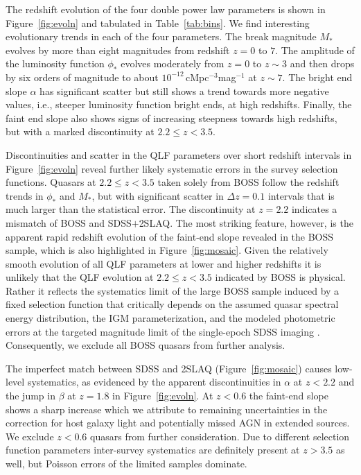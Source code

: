\documentclass[fleqn,usenatbib]{mnras}
\begin{document}
The redshift evolution of the four double power law parameters is
shown in Figure~\ref{fig:evoln} and tabulated in Table~\ref{tab:bins}.
We find interesting evolutionary trends in each of the four
parameters.  The break magnitude $M_*$ evolves by more than eight
magnitudes from redshift $z=0$ to $7$.  The amplitude of the
luminosity function $\phi_*$ evolves moderately from $z=0$ to $z\sim
3$ and then drops by six orders of magnitude to about
$10^{-12}$\,cMpc$^{-3}$mag$^{-1}$ at $z\sim 7$.  The bright end slope
$\alpha$ has significant scatter but still shows a trend towards more
negative values, i.e., steeper luminosity function bright ends, at
high redshifts. Finally, the faint end slope also shows signs of
increasing steepness towards high redshifts, but with a marked
discontinuity at $2.2\le z<3.5$.

Discontinuities and scatter in the QLF parameters over short redshift
intervals in Figure~\ref{fig:evoln} reveal further likely systematic
errors in the survey selection functions.  Quasars at $2.2\le z<3.5$
taken solely from BOSS \citep{2013ApJ...773...14R} follow the redshift
trends in $\phi_*$ and $M_*$, but with significant scatter in $\Delta
z=0.1$ intervals that is much larger than the statistical error.  The
discontinuity at $z=2.2$ indicates a mismatch of BOSS and
SDSS$+$2SLAQ. The most striking feature, however, is the apparent
rapid redshift evolution of the faint-end slope revealed in the BOSS
sample, which is also highlighted in Figure~\ref{fig:mosaic}. Given
the relatively smooth evolution of all QLF parameters at lower and
higher redshifts it is unlikely that the QLF evolution at $2.2\le
z<3.5$ indicated by BOSS is physical.  Rather it reflects the
systematics limit of the large BOSS sample induced by a fixed
selection function that critically depends on the assumed quasar
spectral energy distribution, the IGM parameterization, and the
modeled photometric errors at the targeted magnitude limit of the
single-epoch SDSS imaging
\citep{2011ApJ...728...23W, 2012ApJS..199....3R, 2013ApJ...773...14R}.
Consequently, we exclude all BOSS quasars from further analysis.

The imperfect match between SDSS and 2SLAQ (Figure~\ref{fig:mosaic})
causes low-level systematics, as evidenced by the apparent
discontinuities in $\alpha$ at $z<2.2$ and the jump in $\beta$ at
$z=1.8$ in Figure~\ref{fig:evoln}.  At $z<0.6$ the faint-end slope
shows a sharp increase which we attribute to remaining uncertainties
in the correction for host galaxy light and potentially missed AGN in
extended sources. We exclude $z<0.6$ quasars from further
consideration. Due to different selection function parameters
inter-survey systematics are definitely present at $z>3.5$ as well,
but Poisson errors of the limited samples dominate.
\end{document}

